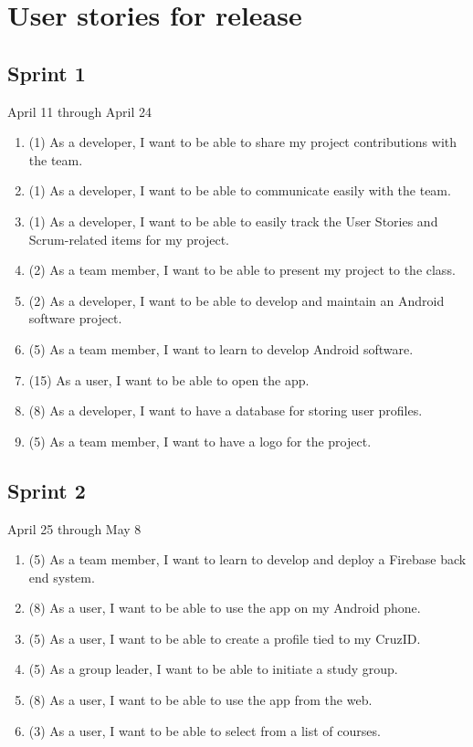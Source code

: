 \documentclass[10pt]{article}
\begin{document}
    \section{User stories for release}

    \subsection{Sprint 1}
    April 11 through April 24
    \begin{enumerate}
        \item (1) As a developer, I want to be able to share my project contributions with the team.
        \item (1) As a developer, I want to be able to communicate easily with the team.
        \item (1) As a developer, I want to be able to easily track the User Stories and Scrum-related items for my project.
        \item (2) As a team member, I want to be able to present my project to the class.
        \item (2) As a developer, I want to be able to develop and maintain an Android software project.
        \item (5) As a team member, I want to learn to develop Android software.
        \item (15) As a user, I want to be able to open the app.
        \item (8) As a developer, I want to have a database for storing user profiles.
        \item (5) As a team member, I want to have a logo for the project.
    \end{enumerate}

    \subsection{Sprint 2}
    April 25 through May 8
    \begin{enumerate}
        \item (5) As a team member, I want to learn to develop and deploy a Firebase back end system.
        \item (8) As a user, I want to be able to use the app on my Android phone.
        \item (5) As a user, I want to be able to create a profile tied to my CruzID.
        \item (5) As a group leader, I want to be able to initiate a study group.
        \item (8) As a user, I want to be able to use the app from the web.
        \item (3) As a user, I want to be able to select from a list of courses.
    \end{enumerate}
    
\end{document}
